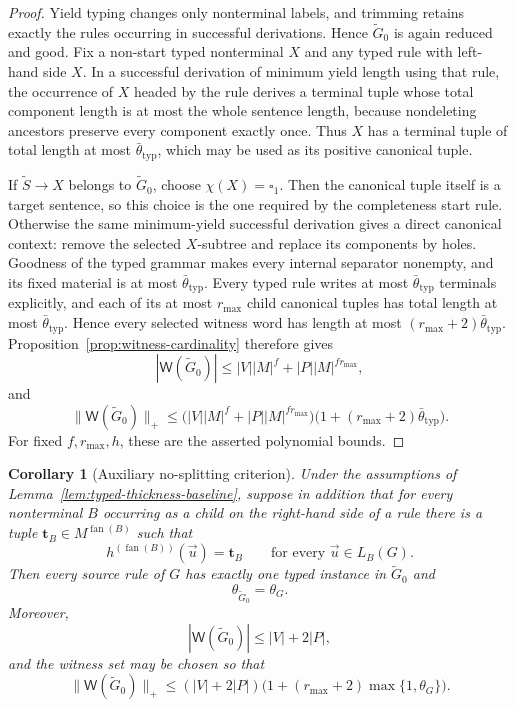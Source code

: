 \documentclass[11pt]{article}
\numberwithin{equation}{section}
\theoremstyle{plain}
\newtheorem{corollary}[theorem]{Corollary}
\theoremstyle{definition}
\theoremstyle{remark}
\newcommand{\Wit}{\mathsf{W}}
\newcommand{\tuple}[1]{\vec{#1}}
\newcommand{\blank}{\square}
\newcommand{\fan}{\operatorname{fan}}
\begin{document}
\begin{proof}
Yield typing changes only nonterminal labels, and trimming retains exactly the
rules occurring in successful derivations.  Hence $\widetilde G_0$ is again
reduced and good.  Fix a non-start typed nonterminal $X$ and any typed rule with left-hand side $X$.  In a successful derivation of minimum yield length using
that rule, the occurrence of $X$ headed by the rule derives a terminal tuple
whose total component length is at most the whole sentence length, because
nondeleting ancestors preserve every component exactly once.  Thus $X$ has a
terminal tuple of total length at most $\bar\theta_{\mathrm{typ}}$, which may be
used as its positive canonical tuple.

If $\widetilde S\to X$ belongs to $\widetilde G_0$, choose
$\chi(X)=\blank_1$.  Then the canonical tuple itself is a target sentence, so this
choice is the one required by the completeness start rule.  Otherwise the
same minimum-yield successful derivation gives a direct canonical context: remove the
selected $X$-subtree and replace its components by holes.  Goodness of the
typed grammar makes every internal separator nonempty, and its fixed material
is at most $\bar\theta_{\mathrm{typ}}$.  Every typed rule writes at
most $\bar\theta_{\mathrm{typ}}$ terminals explicitly, and each of its at
most $r_{\max}$ child canonical tuples has total length at most
$\bar\theta_{\mathrm{typ}}$.  Hence every selected witness word has length at most
$(r_{\max}+2)\bar\theta_{\mathrm{typ}}$.  Proposition~\ref{prop:witness-cardinality}
therefore gives
\[
 |\Wit(\widetilde G_0)|
 \le |V||M|^f+|P||M|^{f r_{\max}},
\]
and
\[
 \|\Wit(\widetilde G_0)\|_+
 \le
 \bigl(|V||M|^f+|P||M|^{f r_{\max}}\bigr)
 \bigl(1+(r_{\max}+2)\bar\theta_{\mathrm{typ}}\bigr).
\]
For fixed $f,r_{\max},h$, these are the asserted polynomial bounds.
\end{proof}

\begin{corollary}[Auxiliary no-splitting criterion]
\label{cor:no-splitting-thickness}
Under the assumptions of Lemma~\ref{lem:typed-thickness-baseline}, suppose in
addition that for every nonterminal $B$ occurring as a child on the right-hand
side of a rule there is a tuple
$\mathbf t_B\in M^{\fan(B)}$ such that
\[
  h^{(\fan(B))}(\tuple u)=\mathbf t_B
  \qquad\text{for every }\tuple u\in L_B(G).
\]
Then every source rule of $G$ has exactly one typed instance in
$\widetilde G_0$ and
\[
  \theta_{\widetilde G_0}=\theta_G.
\]
Moreover,
\[
  |\Wit(\widetilde G_0)|\le |V|+2|P|,
\]
and the witness set may be chosen so that
\[
  \|\Wit(\widetilde G_0)\|_+
  \le
  (|V|+2|P|)
  \bigl(1+(r_{\max}+2)\max\{1,\theta_G\}\bigr).
\]
\end{corollary}
\end{document}
